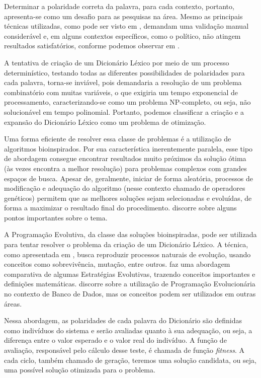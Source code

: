 \documentclass[a4paper,11pt]{article}
\begin{document}
Determinar a polaridade correta da palavra, para cada contexto, portanto, apresenta-se como um desafio para as pesquisas na área. Mesmo as principais técnicas utilizadas, como pode ser visto em \cite{taboada2011lexicon}, demandam uma validação manual considerável e, em alguns contextos específicos, como o político, não atingem resultados satisfatórios, conforme podemos observar em \cite{kdir16}.

A tentativa de criação de um Dicionário Léxico por meio de um processo determinístico, testando todas as diferentes possibilidades de polaridades para cada palavra, torna-se inviável, pois demandaria a resolução de um problema combinatório com muitas variáveis, o que exigiria um tempo exponencial de processamento, caracterizando-se como um problema NP-completo, ou seja, não solucionável em tempo polinomial. Portanto, podemos classificar a criação e a expansão do Dicionário Léxico como um problema de otimização.

Uma forma eficiente de resolver essa classe de problemas é a utilização de algoritmos bioinspirados. Por sua característica inerentemente paralela, esse tipo de abordagem consegue encontrar resultados muito próximos da solução ótima (às vezes encontra a melhor resolução) para problemas complexos com grandes espaços de busca. Apesar de, geralmente, iniciar de forma aleatória, processos de modificação e adequação do algoritmo (nesse contexto chamado de operadores genéticos) permitem que as melhores soluções sejam selecionadas e evoluídas, de forma a maximizar o resultado final do procedimento. \cite{Abbasi} discorre sobre alguns pontos importantes sobre o tema.

A Programação Evolutiva, da classe das soluções bioinspiradas, pode ser utilizada para tentar resolver o problema da criação de um Dicionário Léxico. A técnica, como apresentada em \cite{Fogel2000}, busca reproduzir processos naturais de evolução, usando conceitos como sobrevivência, mutação, entre outros. \cite{back} faz uma abordagem comparativa de algumas Estratégias Evolutivas, trazendo conceitos importantes e definições matemáticas. \cite{silveirageraccao} discorre sobre a utilização de Programação Evolucionária no contexto de Banco de Dados, mas os conceitos podem ser utilizados em outras áreas. 

Nessa abordagem, as polaridades de cada palavra do Dicionário são definidas como indivíduos do sistema e serão avaliadas quanto à sua adequação, ou seja, a diferença entre o valor esperado e o valor real do indivíduo. A função de avaliação, responsável pelo cálculo desse teste, é chamada de função \emph{fitness}. A cada ciclo, também chamado de geração, teremos uma solução candidata, ou seja, uma possível solução otimizada para o problema.
\end{document}
